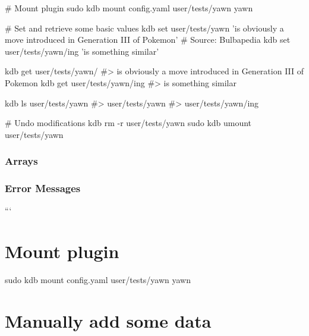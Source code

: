 \begin{DoxyCode}
# Mount plugin
sudo kdb mount config.yaml user/tests/yawn yawn

# Set and retrieve some basic values
kdb set user/tests/yawn 'is obviously a move introduced in Generation III of Pokemon' # Source: Bulbapedia
kdb set user/tests/yawn/ing 'is something similar'

kdb get user/tests/yawn/
#> is obviously a move introduced in Generation III of Pokemon
kdb get user/tests/yawn/ing
#> is something similar

kdb ls user/tests/yawn
#> user/tests/yawn
#> user/tests/yawn/ing

# Undo modifications
kdb rm -r user/tests/yawn
sudo kdb umount user/tests/yawn
\end{DoxyCode}


\subsubsection*{Arrays}




\subsubsection*{Error Messages}

``` \section*{Mount plugin}

sudo kdb mount config.\+yaml user/tests/yawn yawn

\section*{Manually add some data}

